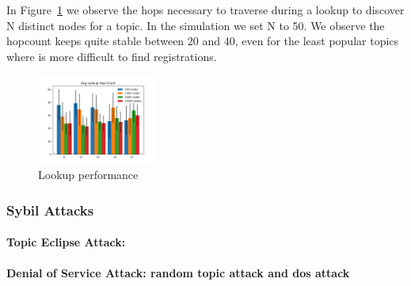 In Figure~\ref{fig:hopcount} we observe the hops necessary to traverse during a lookup to discover N distinct nodes for a topic.
In the simulation we set N to 50.
We observe the hopcount keeps quite stable between 20 and 40, even for the least popular topics where is more difficult to find registrations.


\begin{figure}[h!]
\centering
\includegraphics[width=0.35\textwidth]{img/eval/lookup_hopcount.png}
\caption{Lookup performance}
\label{fig:hopcount}
\vspace{-0.15in}
\end{figure}

\subsubsection{Sybil Attacks}




\paragraph{\bf{Topic Eclipse Attack:}}

%
%
%

\paragraph{\bf{Denial of Service Attack: random topic attack and dos attack}}



